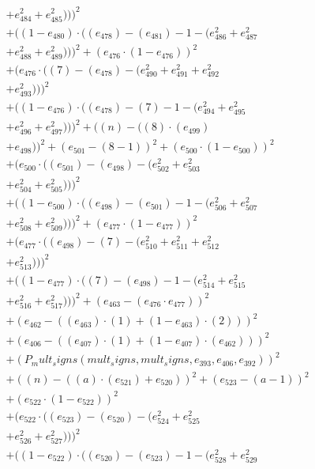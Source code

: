 \documentclass[10pt, a4paper]{article}
\begin{document}
\begin{align*}
& + e_{484}^{2} + e_{485}^{2})))^{2} \\
& + ((1 - e_{480})  \cdot  ((e_{478}) - (e_{481}) - 1 - (e_{486}^{2} + e_{487}^{2} \\
& + e_{488}^{2} + e_{489}^{2})))^{2} + (e_{476}  \cdot  (1 - e_{476}))^{2} \\
& + (e_{476}  \cdot  ((7) - (e_{478}) - (e_{490}^{2} + e_{491}^{2} + e_{492}^{2} \\
& + e_{493}^{2})))^{2} \\
& + ((1 - e_{476})  \cdot  ((e_{478}) - (7) - 1 - (e_{494}^{2} + e_{495}^{2} \\
& + e_{496}^{2} + e_{497}^{2})))^{2} + ((n) - ((8)  \cdot  (e_{499}) \\
& + e_{498}))^{2} + (e_{501} - (8 - 1))^{2} + (e_{500}  \cdot  (1 - e_{500}))^{2} \\
& + (e_{500}  \cdot  ((e_{501}) - (e_{498}) - (e_{502}^{2} + e_{503}^{2} \\
& + e_{504}^{2} + e_{505}^{2})))^{2} \\
& + ((1 - e_{500})  \cdot  ((e_{498}) - (e_{501}) - 1 - (e_{506}^{2} + e_{507}^{2} \\
& + e_{508}^{2} + e_{509}^{2})))^{2} + (e_{477}  \cdot  (1 - e_{477}))^{2} \\
& + (e_{477}  \cdot  ((e_{498}) - (7) - (e_{510}^{2} + e_{511}^{2} + e_{512}^{2} \\
& + e_{513}^{2})))^{2} \\
& + ((1 - e_{477})  \cdot  ((7) - (e_{498}) - 1 - (e_{514}^{2} + e_{515}^{2} \\
& + e_{516}^{2} + e_{517}^{2})))^{2} + (e_{463} - (e_{476}  \cdot  e_{477}))^{2} \\
& + (e_{462} - ((e_{463})  \cdot  (1) + (1 - e_{463})  \cdot  (2)))^{2} \\
& + (e_{406} - ((e_{407})  \cdot  (1) + (1 - e_{407})  \cdot  (e_{462})))^{2} \\
& + (P_mult_signs(mult_signs, mult_signs, e_{393}, e_{406}, e_{392}))^{2} \\
& + ((n) - ((a)  \cdot  (e_{521}) + e_{520}))^{2} + (e_{523} - (a - 1))^{2} \\
& + (e_{522}  \cdot  (1 - e_{522}))^{2} \\
& + (e_{522}  \cdot  ((e_{523}) - (e_{520}) - (e_{524}^{2} + e_{525}^{2} \\
& + e_{526}^{2} + e_{527}^{2})))^{2} \\
& + ((1 - e_{522})  \cdot  ((e_{520}) - (e_{523}) - 1 - (e_{528}^{2} + e_{529}^{2} \\

\end{align*}
\end{document}
